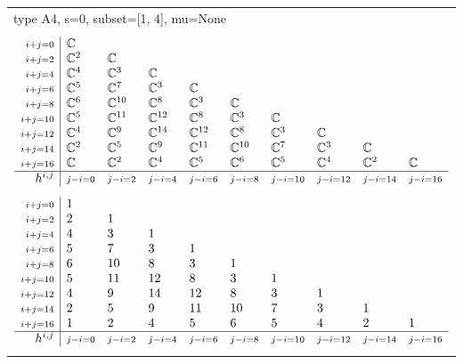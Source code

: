 \documentclass[crop,border=2mm]{standalone}
\begin{document}
\begin{tabular}{l}
{\huge type A4, s=0, subset=[1, 4], mu=None}\\ \\


$\displaystyle
\begin{array}{r|l l l l l l l l l}
	{\scriptstyle i+j=0}&\mathbb{C}&&&&&&&&\\
	{\scriptstyle i+j=2}&\mathbb{C}^{2}&\mathbb{C}&&&&&&&\\
	{\scriptstyle i+j=4}&\mathbb{C}^{4}&\mathbb{C}^{3}&\mathbb{C}&&&&&&\\
	{\scriptstyle i+j=6}&\mathbb{C}^{5}&\mathbb{C}^{7}&\mathbb{C}^{3}&\mathbb{C}&&&&&\\
	{\scriptstyle i+j=8}&\mathbb{C}^{6}&\mathbb{C}^{10}&\mathbb{C}^{8}&\mathbb{C}^{3}&\mathbb{C}&&&&\\
	{\scriptstyle i+j=10}&\mathbb{C}^{5}&\mathbb{C}^{11}&\mathbb{C}^{12}&\mathbb{C}^{8}&\mathbb{C}^{3}&\mathbb{C}&&&\\
	{\scriptstyle i+j=12}&\mathbb{C}^{4}&\mathbb{C}^{9}&\mathbb{C}^{14}&\mathbb{C}^{12}&\mathbb{C}^{8}&\mathbb{C}^{3}&\mathbb{C}&&\\
	{\scriptstyle i+j=14}&\mathbb{C}^{2}&\mathbb{C}^{5}&\mathbb{C}^{9}&\mathbb{C}^{11}&\mathbb{C}^{10}&\mathbb{C}^{7}&\mathbb{C}^{3}&\mathbb{C}&\\
	{\scriptstyle i+j=16}&\mathbb{C}&\mathbb{C}^{2}&\mathbb{C}^{4}&\mathbb{C}^{5}&\mathbb{C}^{6}&\mathbb{C}^{5}&\mathbb{C}^{4}&\mathbb{C}^{2}&\mathbb{C}\\
	\hline h^{i,j}&{\scriptstyle j-i=0}&{\scriptstyle j-i=2}&{\scriptstyle j-i=4}&{\scriptstyle j-i=6}&{\scriptstyle j-i=8}&{\scriptstyle j-i=10}&{\scriptstyle j-i=12}&{\scriptstyle j-i=14}&{\scriptstyle j-i=16}
\end{array}
$ \\ \\


$\displaystyle
\begin{array}{r|l l l l l l l l l}
	{\scriptstyle i+j=0}&1&&&&&&&&\\
	{\scriptstyle i+j=2}&2&1&&&&&&&\\
	{\scriptstyle i+j=4}&4&3&1&&&&&&\\
	{\scriptstyle i+j=6}&5&7&3&1&&&&&\\
	{\scriptstyle i+j=8}&6&10&8&3&1&&&&\\
	{\scriptstyle i+j=10}&5&11&12&8&3&1&&&\\
	{\scriptstyle i+j=12}&4&9&14&12&8&3&1&&\\
	{\scriptstyle i+j=14}&2&5&9&11&10&7&3&1&\\
	{\scriptstyle i+j=16}&1&2&4&5&6&5&4&2&1\\
	\hline h^{i,j}&{\scriptstyle j-i=0}&{\scriptstyle j-i=2}&{\scriptstyle j-i=4}&{\scriptstyle j-i=6}&{\scriptstyle j-i=8}&{\scriptstyle j-i=10}&{\scriptstyle j-i=12}&{\scriptstyle j-i=14}&{\scriptstyle j-i=16}
\end{array}
$ \\ \\



\end{tabular}
\end{document}
